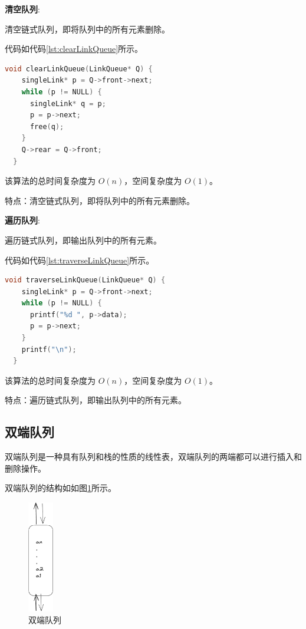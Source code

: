 \documentclass[lang=cn,newtx,10pt,scheme=chinese]{../elegantbook}
\begin{document}
\textbf{清空队列}:

清空链式队列，即将队列中的所有元素删除。

代码如代码\ref{lst:clearLinkQueue}所示。

\begin{lstlisting}[language=C++, caption={清空队列示例代码}, label={lst:clearLinkQueue}]
  void clearLinkQueue(LinkQueue* Q) {
    singleLink* p = Q->front->next;
    while (p != NULL) {
      singleLink* q = p;
      p = p->next;
      free(q);
    }
    Q->rear = Q->front;
  }

\end{lstlisting}

该算法的总时间复杂度为 $O(n)$，空间复杂度为 $O(1)$。

特点：清空链式队列，即将队列中的所有元素删除。

\textbf{遍历队列}:

遍历链式队列，即输出队列中的所有元素。

代码如代码\ref{lst:traverseLinkQueue}所示。

\begin{lstlisting}[language=C++, caption={遍历队列示例代码}, label={lst:traverseLinkQueue}]
  void traverseLinkQueue(LinkQueue* Q) {
    singleLink* p = Q->front->next;
    while (p != NULL) {
      printf("%d ", p->data);
      p = p->next;
    }
    printf("\n");
  }

\end{lstlisting}

该算法的总时间复杂度为 $O(n)$，空间复杂度为 $O(1)$。

特点：遍历链式队列，即输出队列中的所有元素。





\subsection{双端队列}

双端队列是一种具有队列和栈的性质的线性表，双端队列的两端都可以进行插入和删除操作。

双端队列的结构如如图\ref{fig:deque}所示。

\begin{figure}[h]
  \centering
  \includegraphics[width=0.1\textwidth]{./figure/pdf/cropped/DQueue.pdf}
  \caption{双端队列}
  \label{fig:deque}
\end{figure}
\end{document}
